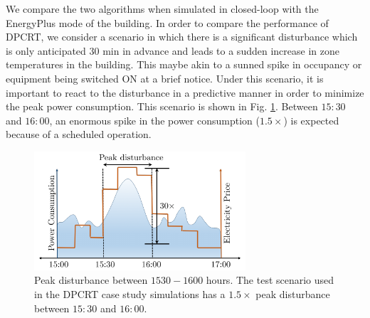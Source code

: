 We compare the two algorithms when simulated in closed-loop with the EnergyPlus mode of the building. In order to compare the performance of DPCRT, we consider a scenario in which there is a significant disturbance which is only anticipated $30$ min in advance and leads to a sudden increase in zone temperatures in the building. This maybe akin to a sunned spike in occupancy or equipment being switched ON at a brief notice. Under this scenario, it is important to react to the disturbance in a predictive manner in order to minimize the peak power consumption. This scenario is shown in Fig. \ref{F:scenario}. Between $15:30$ and $16:00$, an enormous spike in the power consumption ($1.5\times$) is expected because of a scheduled operation.
\begin{figure}
	\centering
	\hspace{1pt}
	\includegraphics[width=0.7\textwidth]{figs/peakpowerplot.pdf}
	\centering
	\caption{Peak disturbance between $1530-1600$ hours. The test scenario used in the DPCRT case study simulations has a $1.5\times$ peak disturbance between $15:30$ and $16:00$.}
	\label{F:scenario}
	\vspace{-10pt}
\end{figure}
